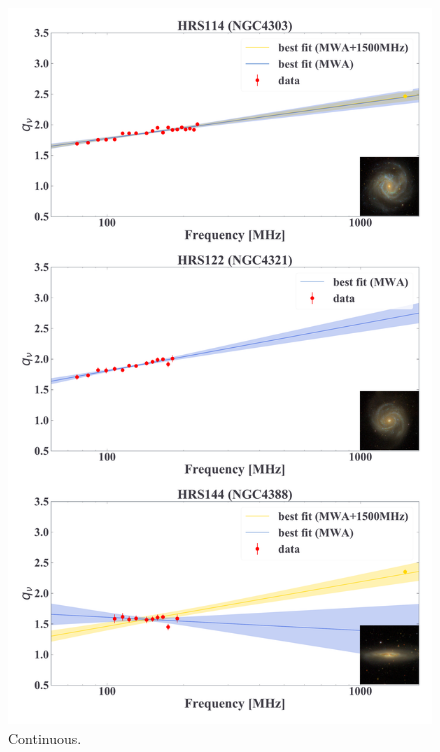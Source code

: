 \documentclass[12pt,a4paper,twoside,openright,final,titlepage]{report}
\begin{document}
\begin{figure}[htbp]
    \centering
    \includegraphics[width=.85\linewidth]{Figures/AppendixC_qfitting3.pdf}
    \caption[Fitting results for 18 samples (3)]{\label{fig:fittingresults3}
        Continuous.
    }
\end{figure}
\end{document}
